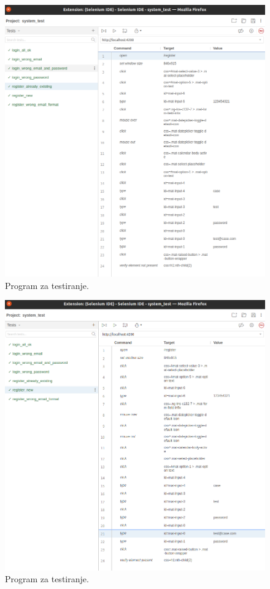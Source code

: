             \begin{figure}[H]
                \includegraphics[width=\textwidth]{slike/tests_system/register_already_existing.png} %
                \caption{Program za testiranje.}
                \label{fig:struktura} %
            \end{figure}

            \begin{figure}[H]
                \includegraphics[width=\textwidth]{slike/tests_system/register_new.png} %
                \caption{Program za testiranje.}
                \label{fig:struktura} %
            \end{figure}
		
